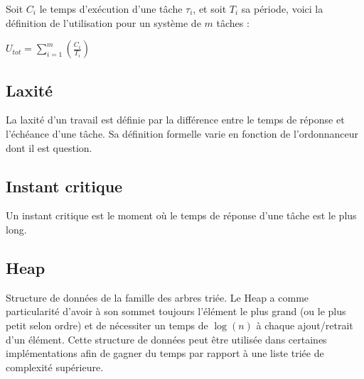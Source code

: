 	Soit $C_i$ le temps d'exécution d'une tâche $\tau_i$, et soit $T_i$ sa période, voici la définition de 
	l'utilisation pour un système de $m$ tâches :\medskip
	\begin{center}
		$U_{tot} = \sum_{i = 1}^{m}(\frac{C_i}{T_i})$
	\end{center}
	
	\subsection{Laxité}
	\label{laxite}
	La laxité d'un travail est définie par la différence entre le temps de réponse et l'échéance 
	d'une tâche. Sa définition formelle varie en fonction de l'ordonnanceur dont il est question.
	
	\subsection{Instant critique}
	\label{instantcritique}
	Un instant critique est le moment où le temps de réponse d'une tâche est le plus long.


	\subsection{Heap}\label{heap}
	Structure de données de la famille des arbres triée. Le Heap a comme particularité d'avoir à son sommet toujours l'élément le 
	plus grand (ou le plus petit selon ordre) et de nécessiter un temps de $\log(n)$ à chaque ajout/retrait d'un 
	élément. Cette structure de données peut être utilisée dans certaines implémentations afin de gagner du temps par rapport à une 
	liste triée de complexité supérieure.
	
	
	
